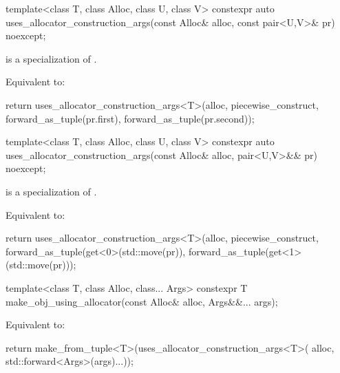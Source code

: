 %
\begin{itemdecl}
template<class T, class Alloc, class U, class V>
  constexpr auto uses_allocator_construction_args(const Alloc& alloc,
                                                  const pair<U,V>& pr) noexcept;
\end{itemdecl}

\begin{itemdescr}
\pnum
\constraints
{} is a specialization of .

\pnum
\effects
Equivalent to:
\begin{codeblock}
return uses_allocator_construction_args<T>(alloc, piecewise_construct,
                                           forward_as_tuple(pr.first),
                                           forward_as_tuple(pr.second));
\end{codeblock}
\end{itemdescr}

%
\begin{itemdecl}
template<class T, class Alloc, class U, class V>
  constexpr auto uses_allocator_construction_args(const Alloc& alloc,
                                                  pair<U,V>&& pr) noexcept;
\end{itemdecl}

\begin{itemdescr}
\pnum
\constraints
{} is a specialization of .

\pnum
\effects
Equivalent to:
\begin{codeblock}
return uses_allocator_construction_args<T>(alloc, piecewise_construct,
                                           forward_as_tuple(get<0>(std::move(pr)),
                                           forward_as_tuple(get<1>(std::move(pr)));
\end{codeblock}
\end{itemdescr}

%
\begin{itemdecl}
template<class T, class Alloc, class... Args>
  constexpr T make_obj_using_allocator(const Alloc& alloc, Args&&... args);
\end{itemdecl}

\begin{itemdescr}
\pnum
\effects
Equivalent to:
\begin{codeblock}
return make_from_tuple<T>(uses_allocator_construction_args<T>(
                            alloc, std::forward<Args>(args)...));
\end{codeblock}
\end{itemdescr}

